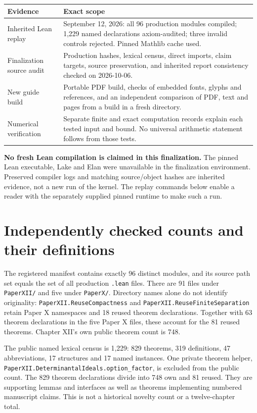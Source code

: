 \documentclass[11pt]{article}
\newcommand{\code}[1]{\nolinkurl{#1}}
\newcommand{\module}[1]{\nolinkurl{PaperXII.#1}}
\begin{document}
\begin{center}
\begin{tabular}{p{}p{}}
\toprule Evidence & Exact scope\\\midrule
Inherited Lean replay & September 12, 2026: all 96 production modules compiled; 1,229 named declarations axiom-audited; three invalid controls rejected. Pinned Mathlib cache used.\\
Finalization source audit & Production hashes, lexical census, direct imports, claim targets, source preservation, and inherited report consistency checked on 2026-10-06.\\
New guide build & Portable PDF build, checks of embedded fonts, glyphs and references, and an independent comparison of PDF, text and pages from a build in a fresh directory.\\
Numerical verification & Separate finite and exact computation records explain each tested input and bound. No universal arithmetic statement follows from those tests.\\
\bottomrule
\end{tabular}
\end{center}

\textbf{No fresh Lean compilation is claimed in this finalization.} The pinned Lean executable, Lake and Elan were unavailable in the finalization environment. Preserved compiler logs and matching source/object hashes are inherited evidence, not a new run of the kernel. The replay commands below enable a reader with the separately supplied pinned runtime to make such a run.

\section{Independently checked counts and their definitions}
The registered manifest contains exactly 96 distinct modules, and its source path set equals the set of all production \code{.lean} files. There are 91 files under \code{PaperXII/} and five under \code{PaperX/}. Directory names alone do not identify originality: \module{ReuseCompactness} and \module{ReuseFiniteSeparation} retain Paper X namespaces and 18 reused theorem declarations. Together with 63 theorem declarations in the five Paper X files, these account for the 81 reused theorems. Chapter XII's own public theorem count is 748.

The public named lexical census is 1,229: 829 theorems, 319 definitions, 47 abbreviations, 17 structures and 17 named instances. One private theorem helper, \code{PaperXII.DeterminantalIdeals.option_factor}, is excluded from the public count. The 829 theorem declarations divide into 748 own and 81 reused. They are supporting lemmas and interfaces as well as theorems implementing numbered manuscript claims. This is not a historical novelty count or a twelve-chapter total.
\end{document}
